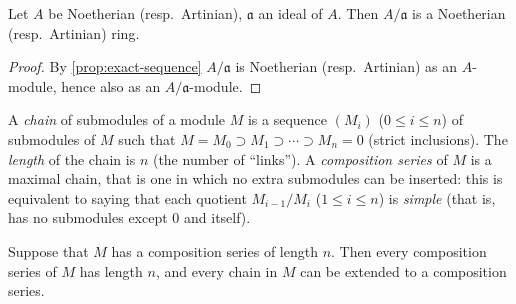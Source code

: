 \begin{proposition}\label{prop:quotient-ring}
    Let $A$ be Noetherian (resp.\ Artinian), $\mathfrak{a}$ an ideal of $A$. Then $A/\mathfrak{a}$ is a Noetherian (resp.\ Artinian) ring.
\end{proposition}
\begin{proof}
    By \eqref{prop:exact-sequence} $A/\mathfrak{a}$ is Noetherian (resp.\ Artinian) as an $A$-module, hence also as an $A/\mathfrak{a}$-module.
\end{proof}

A \emph{chain} of submodules of a module $M$ is a sequence $(M_i)$ ($0 \leq i \leq n$) of submodules of $M$ such that $M = M_0 \supset M_1 \supset \cdots \supset M_n = 0$ (strict inclusions). The \emph{length} of the chain is $n$ (the number of ``links''). A \emph{composition series} of $M$ is a maximal chain, that is one in which no extra submodules can be inserted: this is equivalent to saying that each quotient $M_{i-1}/M_i$ ($1 \leq i \leq n$) is \emph{simple} (that is, has no submodules except $0$ and itself).

\begin{proposition}\label{prop:composition-series}
Suppose that $M$ has a composition series of length $n$. Then every composition series of $M$ has length $n$, and every chain in $M$ can be extended to a composition series.
\end{proposition}

